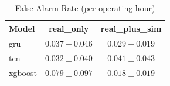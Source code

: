 \begin{table}[htbp]
\centering
\caption{False Alarm Rate (per operating hour)}
\label{tab:far}
\begin{tabular}{lcc}
\hline
Model & real_only & real_plus_sim \\
\hline
gru & $0.037 \pm 0.046$ & $0.029 \pm 0.019$ \\
tcn & $0.032 \pm 0.040$ & $0.041 \pm 0.043$ \\
xgboost & $0.079 \pm 0.097$ & $0.018 \pm 0.019$ \\
\hline
\end{tabular}
\end{table}